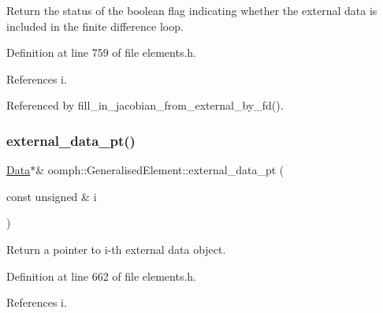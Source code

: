 Return the status of the boolean flag indicating whether the external data is included in the finite difference loop. 



Definition at line 759 of file elements.\+h.



References i.



Referenced by fill\+\_\+in\+\_\+jacobian\+\_\+from\+\_\+external\+\_\+by\+\_\+fd().

\mbox{\label{classoomph_1_1GeneralisedElement_a3ec4e27a7a3d16122b00e2b5be0d1036}} 
\subsubsection{\texorpdfstring{external\+\_\+data\+\_\+pt()}{external\_data\_pt()}\hspace{0.1cm}{\footnotesize\ttfamily [1/2]}}
{\footnotesize\ttfamily \hyperlink{classoomph_1_1Data}{Data}$\ast$\& oomph\+::\+Generalised\+Element\+::external\+\_\+data\+\_\+pt (\begin{DoxyParamCaption}\item[{const unsigned \&}]{i }\end{DoxyParamCaption})\hspace{0.3cm}{\ttfamily [inline]}}



Return a pointer to i-\/th external data object. 



Definition at line 662 of file elements.\+h.



References i.



